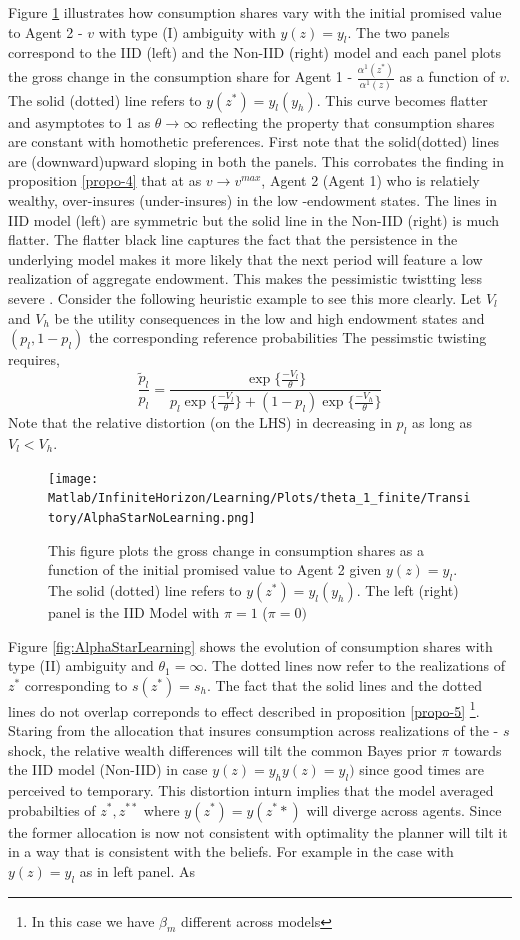 \documentclass[12pt]{article}
\begin{document}
\noindent Figure \ref{fig:AlphaStarNoLearning} illustrates how consumption shares vary with the initial promised value to Agent 2 - $v$ with type (I) ambiguity with $y(z)=y_l$. The two panels correspond to the IID (left) and the Non-IID (right) model and each panel plots the gross change in the consumption share for Agent 1 - $\frac{\alpha^1(z^*)}{\alpha^1(z)}$ as a function of $v$.  The solid (dotted) line refers to $y(z^*)=y_l (y_h)$. This curve becomes flatter and asymptotes to 1 as  $\theta \to \infty$ reflecting the property that consumption shares are constant with homothetic preferences. First note that the solid(dotted) lines are (downward)upward sloping in both the panels. This corrobates the finding in proposition \ref{propo-4} that at as $v\to v^{max}$, Agent 2 (Agent 1) who is relatiely wealthy, over-insures (under-insures) in the low -endowment states. The lines in IID model (left) are symmetric but the solid line in the Non-IID (right) is much flatter. The flatter black line captures the fact 
that the persistence  in the underlying model makes it more likely that the next period will feature a low realization of aggregate endowment. This makes the pessimistic twistting less severe . Consider the following heuristic example to see this more clearly. Let $V_l$ and $V_h$ be the utility consequences in the low and high endowment states and $(p_l,1-p_l)$ the corresponding reference probabilities The pessimstic twisting requires, 
\[\frac{\tilde{p}_l}{p_l}=\frac{\exp\{\frac{-V_l}{\theta}\}}{p_l\exp\{\frac{-V_l}{\theta}\}+(1-p_l)\exp\{\frac{-V_h}{\theta}\}}\]
Note that the relative distortion (on the LHS) in decreasing in $p_l$ as long as $V_l < V_h$.
\begin{figure}[htbp]
\centering
	  \texttt{[image: Matlab/InfiniteHorizon/Learning/Plots/theta\_1\_finite/Transitory/AlphaStarNoLearning.png]}

	\caption{This figure plots the gross change in consumption shares as a function 
of the initial promised value to Agent 2 given $y(z)=y_l$. The solid (dotted) line refers to
 $y(z^*)=y_l (y_h)$. The left (right) panel is the IID Model with $\pi=1$ ($\pi=0)$}
	\label{fig:AlphaStarNoLearning}
\end{figure} 
\noindent Figure \ref{fig:AlphaStarLearning} shows the evolution of consumption shares with type (II) ambiguity and $\theta_1=\infty$. The  dotted lines now refer to the realizations of $z^*$ corresponding to $s(z^*)=s_h$. The fact that the solid lines and the dotted lines do not overlap correponds to effect described in proposition \ref{propo-5} \footnote{In this case we have $\beta_m$ different across models}. Staring  from the allocation that insures consumption across realizations of the - $s$ shock, the relative wealth differences will tilt the common Bayes prior $\pi$ towards the IID model (Non-IID) in case $y(z)=y_hy(z)=y_l)$ since  good times are perceived to temporary. This distortion inturn implies that the model averaged probabilties of $z^*,z^{**}$ where $y(z^*)=y(z^**)$ will diverge across agents. Since the former allocation is now not consistent with optimality the planner will tilt it in a way that is consistent with the beliefs. For example in the case with $y(z)=y_l$ as in left panel. As 
\end{document}
